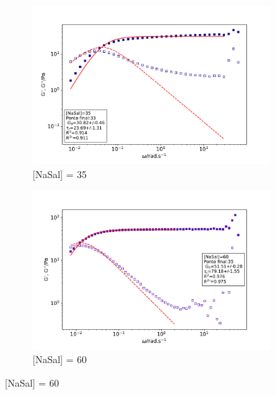 		\begin{figure}[h]
			\begin{subfigure}[t]{0.5\textwidth}
				\includegraphics[width=\textwidth]{imagens/reologia/oscilatorio_agua_35}
				\caption{[NaSal] = 35\mM}
				\label{fig:oscilatorio_agua_35}
			\end{subfigure} %
			\begin{subfigure}[t]{0.5\textwidth}
				\centering
				\includegraphics[width=\textwidth]{imagens/reologia/oscilatorio_agua_60}
				\caption{[NaSal] = 60\mM}
				\label{fig:oscilatorio_agua_60}
			\end{subfigure}
			

\end{figure}
